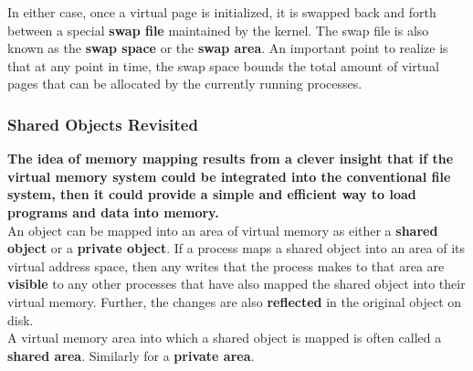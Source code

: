 \documentclass[11pt]{article}
\begin{document}
In either case, once a virtual page is initialized, it is swapped back and forth between a special \textbf{swap file} maintained by the kernel. The swap file is also known as the \textbf{swap space} or the \textbf{swap area}. An important point to realize is that at any point in time, the swap space bounds the total amount of virtual pages that can be allocated by the currently running processes.\\


\subsubsection{Shared Objects Revisited}
\label{sec:org2fa4521}
\textbf{The idea of memory mapping results from a clever insight that if the virtual memory system could be integrated into the conventional file system, then it could provide a simple and efficient way to load programs and data into memory.}\\

An object can be mapped into an area of virtual memory as either a \textbf{shared object} or a \textbf{private object}. If a process maps a shared object into an area of its virtual address space, then any writes that the process makes to that area are \textbf{visible} to any other processes that have also mapped the shared object into their virtual memory. Further, the changes are also \textbf{reflected} in the original object on disk.\\

A virtual memory area into which a shared object is mapped is often called a \textbf{shared area}. Similarly for a \textbf{private area}.\\
\end{document}
